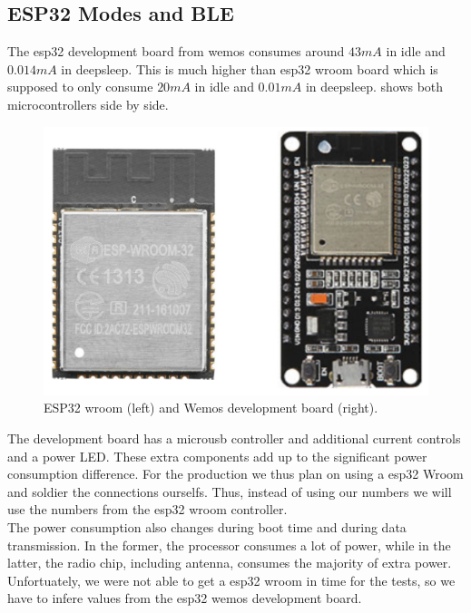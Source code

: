 \subsection{ESP32 Modes and BLE}
The esp32 development board from wemos consumes around $43mA$ in idle and $0.014mA$ in deepsleep. This is much higher than esp32 wroom board which is supposed to only consume $20mA$ in idle and $0.01mA$ in deepsleep\cite{InsightI15esp32ModesWroom:online}.  shows both microcontrollers side by side. 

\begin{figure}[h!]
    \centering
    \includegraphics[scale=0.4]{figures/esp32WroomWemos.png}%
    \caption{ESP32 wroom (left) and Wemos development board (right).}\label{fig:esp32Comp}
\end{figure}

The development board has a microusb controller and additional current controls and a power LED. These extra components add up to the significant power consumption difference. For the production we thus plan on using a esp32 Wroom and soldier the connections ourselfs. Thus, instead of using our numbers we will use the numbers from the esp32 wroom controller\cite{InsightI15esp32ModesWroom:online}.\\

The power consumption also changes during boot time and during data transmission. In the former, the processor consumes a lot of power, while in the latter, the radio chip, including antenna, consumes the majority of extra power. Unfortuately, we were not able to get a esp32 wroom in time for the tests, so we have to infere values from the esp32 wemos development board. \\

